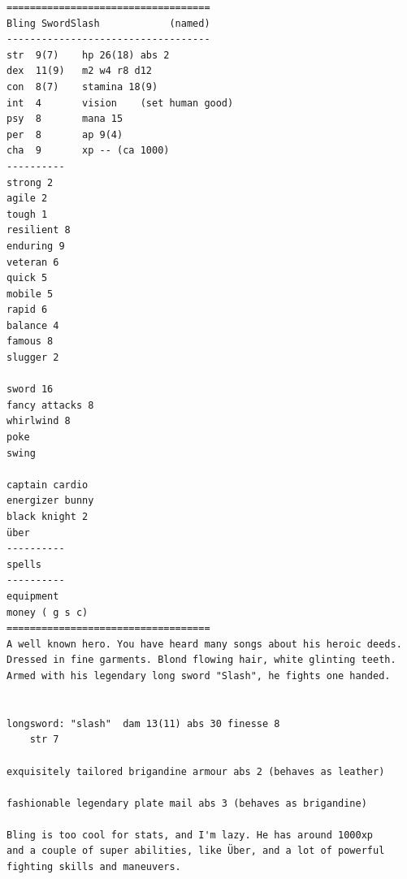 \documentclass[11pt, twoside, titlepage, a4paper]{report}
\begin{document}
\begin{verbatim}
\end{verbatim} \goodbreak \begin{verbatim}
===================================
Bling SwordSlash            (named)
-----------------------------------
str  9(7)    hp 26(18) abs 2
dex  11(9)   m2 w4 r8 d12
con  8(7)    stamina 18(9)
int  4       vision    (set human good)
psy  8       mana 15
per  8       ap 9(4)
cha  9       xp -- (ca 1000)
----------
strong 2
agile 2
tough 1
resilient 8
enduring 9
veteran 6
quick 5
mobile 5
rapid 6
balance 4
famous 8
slugger 2

sword 16
fancy attacks 8
whirlwind 8
poke
swing

captain cardio
energizer bunny
black knight 2
über
----------
spells
----------
equipment
money ( g s c)
===================================
A well known hero. You have heard many songs about his heroic deeds.
Dressed in fine garments. Blond flowing hair, white glinting teeth.
Armed with his legendary long sword "Slash", he fights one handed.


longsword: "slash"  dam 13(11) abs 30 finesse 8
    str 7

exquisitely tailored brigandine armour abs 2 (behaves as leather)

fashionable legendary plate mail abs 3 (behaves as brigandine)

Bling is too cool for stats, and I'm lazy. He has around 1000xp
and a couple of super abilities, like Über, and a lot of powerful
fighting skills and maneuvers.

\end{verbatim}\normalsize





























\clearpage
{}
\end{document}

